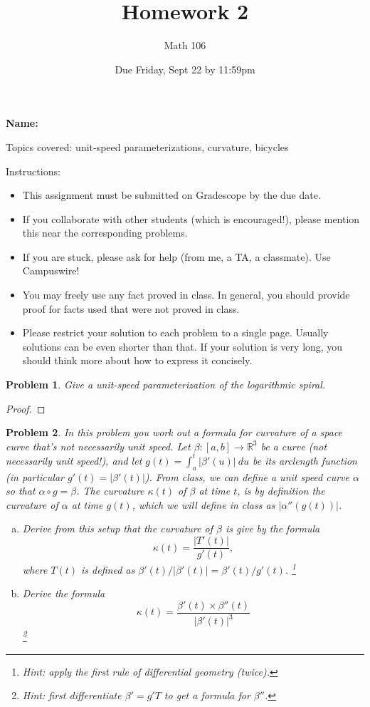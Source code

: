 \documentclass[11pt]{article}
\author{Math 106}
\date{Due Friday, Sept 22 by 11:59pm}
\title{Homework 2}
\newtheorem{problem}{Problem}
\begin{document}
\maketitle

{\bf\Large Name:} 


\vspace{.3in}
Topics covered: unit-speed parameterizations, curvature, bicycles

Instructions: 
\begin{itemize}
\item This assignment must be submitted on Gradescope by the due date. 
\item If you collaborate with other students (which is encouraged!), please mention this near the corresponding problems. 
\item If you are stuck, please ask for help (from me, a TA, a classmate). Use Campuswire!  
\item You may freely use any fact proved in class. In general, you should provide proof for facts used that were not proved in class. 
\item Please restrict your solution to each problem to a single page. Usually solutions can be even shorter than that. If your solution is very long, you should think more about how to express it concisely.
\end{itemize}
\pagebreak 



\begin{problem}
Give a unit-speed parameterization of the logarithmic spiral.
\end{problem}

\begin{proof}

\end{proof}

\pagebreak

\begin{problem}
In this problem you work out a formula for curvature of a space curve that's not necessarily unit speed. Let $\beta:[a,b]\to\mathbb R^3$ be a curve (not necessarily unit speed!), and let $g(t)=\int_a^t|\beta'(u)|\>du$ be its arclength function (in particular $g'(t)=|\beta'(t)|$). From class, we can define a unit speed curve $\alpha$ so that $\alpha\circ g=\beta$. The curvature $\kappa(t)$ of $\beta$ at time $t$, is by definition the curvature of $\alpha$ at time $g(t)$, which we will define in class as $|\alpha''(g(t))|$.  
\begin{enumerate}[(a)]
\item Derive from this setup that the curvature of $\beta$ is give by the formula
\[\kappa(t)=\frac{|T'(t)|}{g'(t)},\]
where $T(t)$ is defined as $\beta'(t)/|\beta'(t)|= \beta'(t)/g'(t)$. \footnote{Hint: apply the first rule of differential geometry (twice). }
\item Derive the formula 
\[\kappa(t)=\frac{\beta'(t)\times\beta''(t)}{|\beta'(t)|^3}
\]\footnote{Hint: first differentiate $\beta'=g'T$ to get a formula for $\beta''$.}
\end{enumerate} 
\end{problem}
\end{document}

